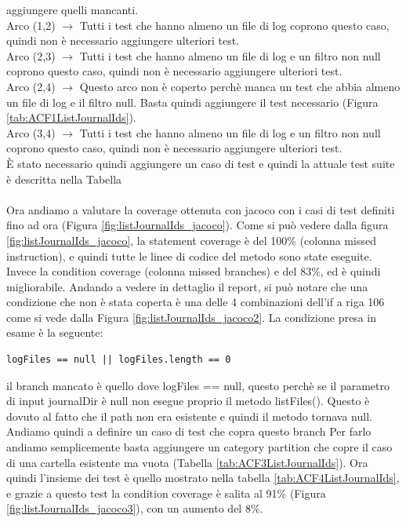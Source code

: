 \documentclass[12pt, a4paper]{article}
\begin{document}
aggiungere quelli mancanti. \\
Arco (1,2)  $\rightarrow$  Tutti i test che hanno almeno un file di log coprono questo caso, quindi non è necessario aggiungere ulteriori test. \\
Arco (2,3)  $\rightarrow$ Tutti i test che hanno almeno un file di log e un filtro non null coprono questo caso, quindi non è necessario aggiungere ulteriori test. \\
Arco (2,4)  $\rightarrow$ Questo arco non è coperto perchè manca un test che abbia almeno un file di log e il filtro null. Basta quindi aggiungere il 
test necessario (Figura \ref{tab:ACF1ListJournalIds}). \\
Arco (3,4)  $\rightarrow$ Tutti i test che hanno almeno un file di log e un filtro non null coprono questo caso, quindi non è necessario aggiungere ulteriori test. \\ 
È stato necessario quindi aggiungere un caso di test e quindi la attuale test suite è descritta nella Tabella  \\ \\
Ora andiamo a valutare la coverage ottenuta con jacoco con i casi di test definiti fino ad ora (Figura \ref{fig:listJournalIds_jacoco}). 
Come si può vedere dalla figura \ref{fig:listJournalIds_jacoco},
la statement coverage è del 100\% (colonna missed instruction), 
e quindi tutte le linee di codice del metodo sono state eseguite. \\
Invece la condition coverage (colonna missed branches) e del 83\%, ed è quindi migliorabile.
Andando a vedere in dettaglio il report, si può notare che una condizione che non è stata coperta
è una delle 4 combinazioni dell'if a riga 106 come si vede dalla Figura \ref{fig:listJournalIds_jacoco2}.
La condizione presa in esame è la seguente:
\begin{verbatim}
logFiles == null || logFiles.length == 0
\end{verbatim}
il branch mancato è quello dove logFiles == null, questo perchè se il parametro di input journalDir è null non esegue proprio il metodo listFiles().
Questo è dovuto al fatto che il path non era esistente e quindi il metodo tornava null.
Andiamo quindi a definire un caso di test che copra questo branch
Per farlo andiamo semplicemente basta aggiungere un category partition che copre il caso di una cartella esistente ma vuota
(Tabella \ref{tab:ACF3ListJournalIds}). Ora quindi l'insieme dei test è quello mostrato nella tabella \ref{tab:ACF4ListJournalIds}, 
e grazie a questo test la condition coverage è salita al 91\% (Figura \ref{fig:listJournalIds_jacoco3}),
con un aumento del 8\%.
\end{document}

